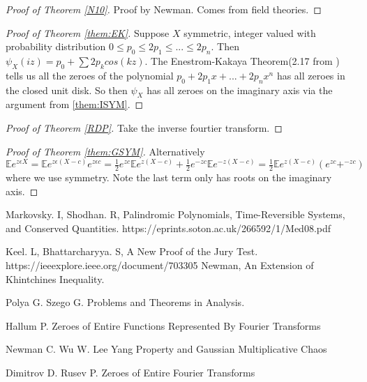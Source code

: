 \documentclass[10pt]{article}
\newcommand{\E}{\mathbb{E}}
\newcommand{\1}{\textbf{1}}
\theoremstyle{remark}
\theoremstyle{definition}
\begin{document}
\begin{proof}[Proof of Theorem \ref{N10}]
	Proof by Newman. Comes from field theories.
\end{proof}


\begin{proof}[Proof of Theorem \ref{them:EK}]
	Suppose $X$ symmetric, integer valued with probability distribution $0 \leq p_0 \leq 2p_1 \leq ... \leq 2p_n$. Then $\psi_X(iz) = p_0 + \sum 2p_k cos(kz)$. The Enestrom-Kakaya Theorem(2.17 from \cite{HP}) tells us all the zeroes of the polynomial $p_0 +2p_1x+...+2p_nx^n$ has all zeroes in the closed unit disk. So then $\psi_X$ has all zeroes on the imaginary axis via the argument from \ref{them:ISYM}.
\end{proof}

\begin{proof}[Proof of Theorem \ref{RDP}]
	Take the inverse fourtier transform.
\end{proof}

\begin{proof}[Proof of Theorem \ref{them:GSYM}]

	Alternatively $\E e^{z \epsilon X} = \E e^{z\epsilon (X-c)}e^{z\epsilon c} = \frac{1}{2}e^{zc}\E e^{z(X-c)}+\frac{1}{2}e^{-zc}\E e^{-z(X-c)} = \frac{1}{2}\E e^{z(X-c)}(e^{zc}+^{-zc})$ where we use symmetry. Note the last term only has roots on the imaginary axis.
\end{proof}


\begin{thebibliography}{9}


 Markovsky. I, Shodhan. R,
Palindromic Polynomials, Time-Reversible Systems, and Conserved Quantities. https://eprints.soton.ac.uk/266592/1/Med08.pdf

 Keel. L, Bhattarcharyya. S,
A New Proof of the Jury Test. https://ieeexplore.ieee.org/document/703305
 Newman, An Extension of Khintchines Inequality. 

 Polya G. Szego G. Problems and Theorems in Analysis. 

 Hallum P. Zeroes of Entire Functions Represented By Fourier Transforms

 Newman C. Wu W. Lee Yang Property and Gaussian Multiplicative Chaos

 Dimitrov D. Rusev P. Zeroes of Entire Fourier Transforms

\end{thebibliography}
\end{document}
